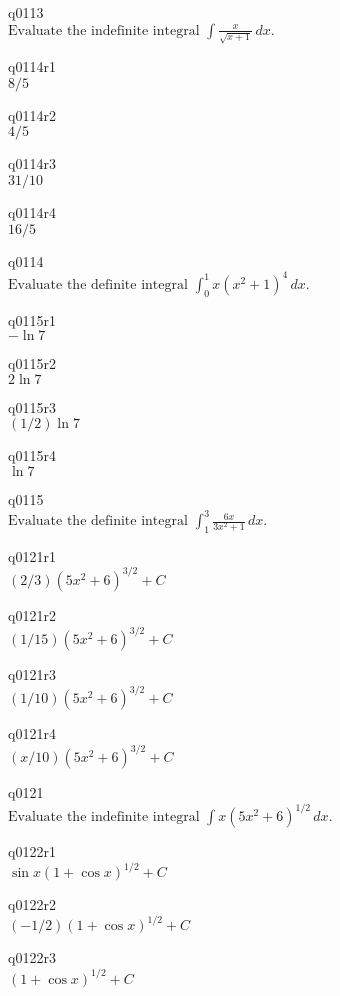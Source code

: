 q0113\\
\(\displaystyle \text{Evaluate the indefinite integral } \int \frac{x}{\sqrt{x+1}}\,dx. \)

q0114r1\\
\(\displaystyle 8/5 \)

q0114r2\\
\(\displaystyle 4/5 \)

q0114r3\\
\(\displaystyle 31/10 \)

q0114r4\\
\(\displaystyle 16/5 \)

q0114\\
\(\displaystyle \text{Evaluate the definite integral } \int_0^1 x(x^2 + 1)^4 \, dx. \)

q0115r1\\
\(\displaystyle -\ln 7 \)

q0115r2\\
\(\displaystyle 2 \ln 7 \)

q0115r3\\
\(\displaystyle (1/2) \ln 7 \)

q0115r4\\
\(\displaystyle \ln 7 \)

q0115\\
\(\displaystyle \text{Evaluate the definite integral } \int_1^3 \frac{6x}{3x^2 + 1} \, dx. \)

q0121r1\\
\(\displaystyle (2/3) (5x^2 + 6)^{3/2} + C \)

q0121r2\\
\(\displaystyle (1/15) (5x^2 + 6)^{3/2} + C \)

q0121r3\\
\(\displaystyle (1/10) (5x^2 + 6)^{3/2} + C \)

q0121r4\\
\(\displaystyle (x/10)(5x^2 + 6)^{3/2} + C \)

q0121\\
\(\displaystyle \text{Evaluate the indefinite integral } \int x(5x^2 + 6)^{1/2} \, dx. \)

q0122r1\\
\(\displaystyle \sin x (1 + \cos x)^{1/2} + C \)

q0122r2\\
\(\displaystyle (-1/2) (1 + \cos x)^{1/2} + C \)

q0122r3\\
\(\displaystyle (1 + \cos x)^{1/2} + C \)

